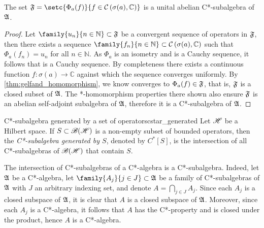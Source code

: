 \begin{corollary}
    The set \(\algebra{F} = \setc{\Phi_a(f)}{f \in \mathcal{C}\left(\sigma(a), \mathbb{C}\right)}\) is a unital abelian C*-subalgebra of \(\mathfrak{A}\).
\end{corollary}
\begin{proof}
    Let \(\family{u_n}{n \in \mathbb{N}} \subset \algebra{F}\) be a convergent sequence of operators in \(\mathfrak{F}\), then there exists a sequence \(\family{f_n}{n \in \mathbb{N}} \subset \mathcal{C}\left(\sigma(a), \mathbb{C}\right)\) such that \(\Phi_a(f_n) = u_n\) for all \(n \in \mathbb{N}\). As \(\Phi_a\) is an isometry and  is a Cauchy sequence, it follows that  is a Cauchy sequence. By completeness there exists a continuous function \(f : \sigma(a) \to \mathbb{C}\) against which the sequence  converges uniformly. By \cref{thm:gelfand_homomorphism}, we know  converges to \(\Phi_a(f) \in \mathfrak{F}\), that is, \(\mathfrak{F}\) is a closed subset of \(\mathfrak{A}\). The *-homomorphism properties there shown also ensure \(\mathfrak{F}\) is an abelian self-adjoint subalgebra of \(\mathfrak{A}\), therefore it is a C*-subalgebra of \(\mathfrak{A}\).
\end{proof}

\begin{definition}{C*-subalgebra generated by a set of operators}{cstar_generated}
    Let \(\mathscr{H}\) be a Hilbert space. If \(S\subset \mathscr{B}(\mathscr{H})\) is a non-empty subset of bounded operators, then the \emph{C*-subalgebra generated by \(S\)}, denoted by \(C^*[S]\), is the intersection of all C*-subalgebras of \(\mathscr{B}(\mathscr{H})\) that contain \(S\).
\end{definition}
\begin{remark}
    The intersection of C*-subalgebras of a C*-algebra is a C*-subalgebra. Indeed, let \(\mathfrak{A}\) be a C*-algebra, let \(\family{A_{j}}{j \in J} \subset \algebra{A}\) be a family of C*-subalgebras of \(\mathfrak{A}\) with \(J\) an arbitrary indexing set, and denote \(A = \bigcap_{j \in J}{A_j}\). Since each \(A_j\) is a closed subspace of \(\mathfrak{A}\), it is clear that \(A\) is a closed subspace of \(\mathfrak{A}\). Moreover, since each \(A_j\) is a C*-algebra, it follows that \(A\) has the C*-property and is closed under the product, hence \(A\) is a C*-algebra.
\end{remark}

